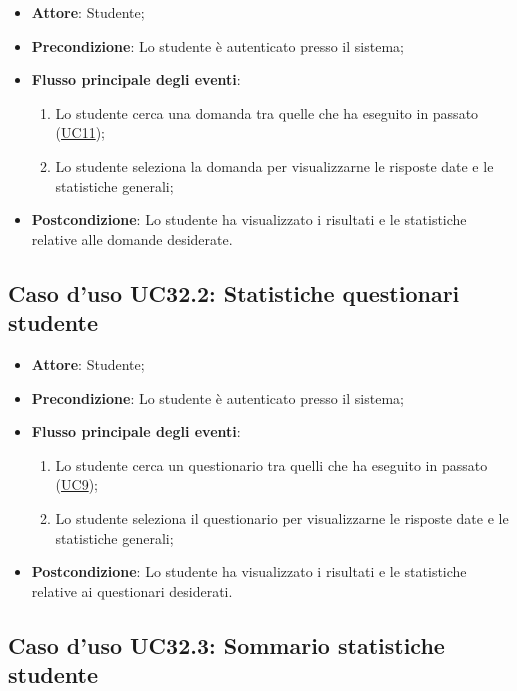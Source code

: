 \documentclass[12pt,a4paper]{article}
\begin{document}
\begin{itemize}

\item \textbf{Attore}: Studente; 
\item \textbf{Precondizione}: Lo studente è autenticato presso il sistema;

\item \textbf{Flusso principale degli eventi}:
\begin{enumerate}
	\item Lo studente cerca una domanda tra quelle che ha eseguito in passato (\hyperlink{UC11}{UC11});
	\item Lo studente seleziona la domanda per visualizzarne le risposte date e le statistiche generali;
	
\end{enumerate}
\item \textbf{Postcondizione}: Lo studente ha visualizzato i risultati e le statistiche relative alle domande desiderate.
\end{itemize}
\hypertarget{UC32.2}{}
\subsection{Caso d'uso UC32.2: Statistiche questionari studente}

\begin{itemize}

\item \textbf{Attore}: Studente; 
\item \textbf{Precondizione}: Lo studente è autenticato presso il sistema;

\item \textbf{Flusso principale degli eventi}:
\begin{enumerate}
	\item Lo studente cerca un questionario tra quelli che ha eseguito in passato (\hyperlink{UC9}{UC9});
	\item Lo studente seleziona il questionario per visualizzarne le risposte date e le statistiche generali;
	
\end{enumerate}
\item \textbf{Postcondizione}: Lo studente ha visualizzato i risultati e le statistiche relative ai questionari desiderati.
\end{itemize}
\hypertarget{UC32.3}{}
\subsection{Caso d'uso UC32.3: Sommario statistiche studente}
\end{document}

